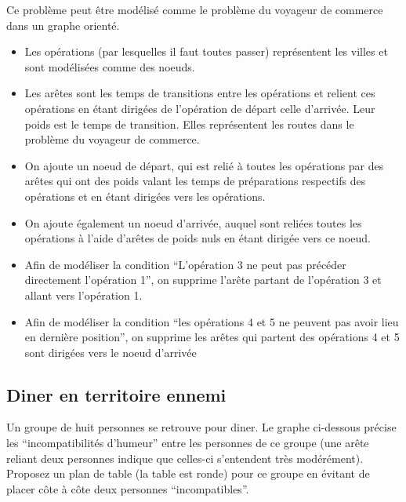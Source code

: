\begin{solution}
Ce problème peut être modélisé comme le problème du voyageur de commerce dans un graphe orienté.
\begin{itemize}
\item Les opérations (par lesquelles il faut toutes passer) représentent les villes et sont modélisées comme des noeuds. 
\item Les arêtes sont les temps de transitions entre les opérations et relient ces opérations en étant dirigées de l'opération de départ  celle d'arrivée. Leur poids est le temps de transition. Elles représentent les routes dans le problème du voyageur de commerce.
\item On ajoute un noeud de départ, qui est relié à toutes les opérations par des arêtes qui ont des poids valant les temps de préparations respectifs des opérations et en étant dirigées vers les opérations. 
\item On ajoute également un noeud d'arrivée, auquel sont reliées toutes les opérations à l'aide d'arêtes de poids nuls en étant dirigée vers ce noeud.
\item Afin de modéliser la condition ``L'opération 3 ne peut pas précéder directement l'opération 1'', on supprime l'arête partant de l'opération 3 et allant vers l'opération 1.
\item Afin de modéliser la condition ``les opérations 4 et 5 ne peuvent pas avoir lieu en dernière position'', on supprime les arêtes qui partent des opérations 4 et 5 sont dirigées vers le noeud d'arrivée
\end{itemize}
\end{solution}

\subsection{Diner en territoire ennemi}
Un groupe de huit personnes se retrouve pour diner. Le graphe ci-dessous précise les ``incompatibilités d'humeur'' entre les personnes de ce groupe (une arête reliant deux personnes indique que celles-ci s'entendent très modérément). Proposez un plan de table (la table est ronde) pour ce groupe en évitant de placer côte à côte deux personnes ``incompatibles''.

